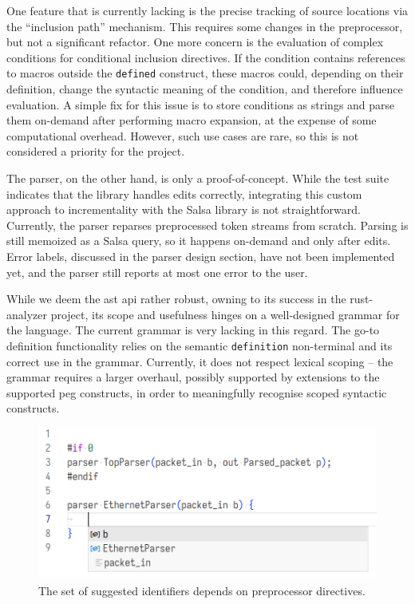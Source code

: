 One feature that is currently lacking is the precise tracking of source
locations via the ``inclusion path'' mechanism. This requires some changes in
the preprocessor, but not a significant refactor. One more concern is the
evaluation of complex conditions for conditional inclusion directives. If the
condition contains references to macros outside the \texttt{defined} construct,
these macros could, depending on their definition, change the syntactic meaning
of the condition, and therefore influence evaluation. A simple fix for this
issue is to store conditions as strings and parse them on-demand after
performing macro expansion, at the expense of some computational overhead.
However, such use cases are rare, so this is not considered a priority for the
project.

The parser, on the other hand, is only a proof-of-concept. While the test suite
indicates that the library handles edits correctly, integrating this custom
approach to incrementality with the Salsa library is not straightforward.
Currently, the parser reparses preprocessed token streams from scratch. Parsing
is still memoized as a Salsa query, so it happens on-demand and only after
edits. Error labels, discussed in the parser design section, have not been
implemented yet, and the parser still reports at most one error to the user.

While we deem the \acrlong{ast} \acrshort{api} rather robust, owning to its
success in the rust-analyzer project, its scope and usefulness hinges on a
well-designed grammar for the \pfs language. The current grammar is very lacking
in this regard. The go-to definition functionality relies on the semantic
\texttt{definition} non-terminal and its correct use in the grammar. Currently,
it does not respect lexical scoping -- the grammar requires a larger overhaul,
possibly supported by extensions to the supported \acrshort{peg} constructs, in
order to meaningfully recognise scoped syntactic constructs.

\begin{figure}[t]
	\centering
	\includegraphics[width=\textwidth]{resources/p4analyzer-preprocessor-response.png}
	\caption{The set of suggested identifiers depends on preprocessor
	directives.}
	\label{fig:preprocessor-response}
\end{figure}

